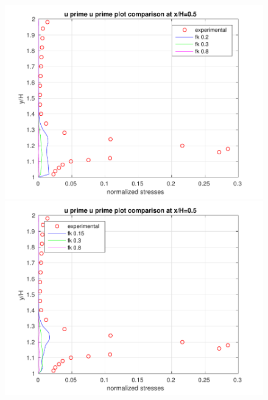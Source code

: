 \begin{figure}[H]
\begin{minipage}[b]{0.5\linewidth}
\includegraphics[scale=0.5]{figure/coarse/UU_coarse_five.pdf}
\end{minipage}
\begin{minipage}[b]{0.5\linewidth}
\includegraphics[scale=0.5]{figure/fine/UU_fine_five.pdf}
\end{minipage}\\
\begin{minipage}[b]{0.5\linewidth}

\end{minipage}
\end{figure}
